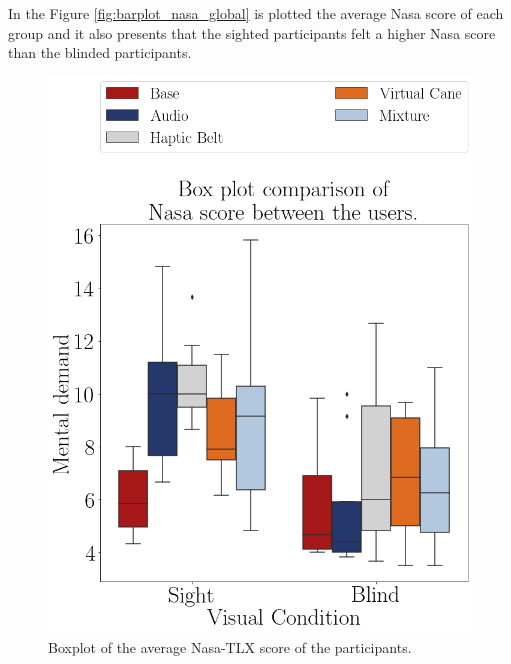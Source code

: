 In the Figure \ref{fig:barplot_nasa_global} is plotted the average Nasa score of each group and it also presents that the sighted participants felt a higher Nasa score than the blinded participants.

\begin{figure}[!htb]
    \begin{minipage}{.45\linewidth}
        \centering
        \includegraphics[width = \linewidth]{Resultados/Nasa/Figuras/png/boxplot_nasa_scene.png}
        \caption{Boxplot of the average Nasa-TLX score of the participants.}
        \label{fig:boxplot_nasa_scene}
    \end{minipage}
    \begin{minipage}{.1\linewidth}
        \hfill
    \end{minipage}
    \begin{minipage}{.45\linewidth}
        \centering

\end{minipage}
\end{figure}
